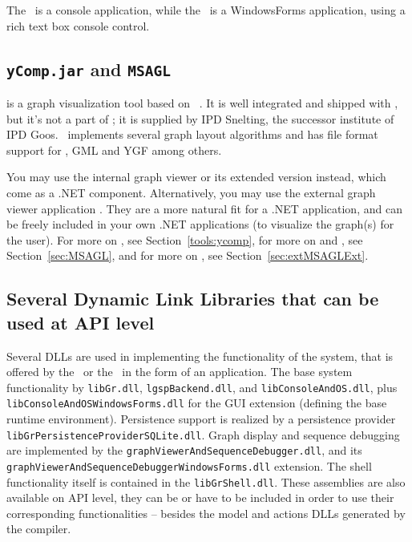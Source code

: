 The \GrShell\ is a console application, while the \GGrShell\ is a WindowsForms application, using a rich text box console control.

\subsection{\texttt{yComp.jar} and \texttt{MSAGL}}

\yComp{} \cite{ycomp} is a graph visualization tool based on \yFiles\ \cite{yfiles}.
It is well integrated and shipped with \GrG, but it's not a part of \GrG; it is supplied by IPD Snelting, the successor institute of IPD Goos.%
\yComp\ implements several graph layout algorithms and has file format support for , GML and YGF among others.

You may use the internal \MSAGL{} graph viewer or its extended version \MSAGLExt{} instead, which come as a .NET component.
Alternatively, you may use the external graph viewer application \extMSAGLExt{}.
They are a more natural fit for a .NET application, and can be freely included in your own .NET applications (to visualize the graph(s) for the user).
For more on \yComp, see Section~\ref{tools:ycomp}, for more on \MSAGL{} and \MSAGLExt{}, see Section~\ref{sec:MSAGL}, and for more on \extMSAGLExt{}, see Section~\ref{sec:extMSAGLExt}.

\subsection{Several Dynamic Link Libraries that can be used at API level}

Several DLLs are used in implementing the functionality of the system, that is offered by the \GrShell\ or the \GGrShell\ in the form of an application.
The base system functionality by \texttt{libGr.dll}, \texttt{lgspBackend.dll}, and \texttt{libConsoleAndOS.dll}, plus \texttt{libConsoleAndOSWindowsForms.dll} for the GUI extension (defining the base runtime environment).
Persistence support is realized by a persistence provider \texttt{libGrPersistenceProviderSQLite.dll}.
Graph display and sequence debugging are implemented by the \texttt{graphViewerAndSequenceDebugger.dll}, and its \texttt{graphViewerAndSequenceDebuggerWindowsForms.dll} extension.
The shell functionality itself is contained in the \texttt{libGrShell.dll}.
These assemblies are also available on API level, they can be or have to be included in order to use their corresponding functionalities -- besides the model and actions DLLs generated by the compiler.


